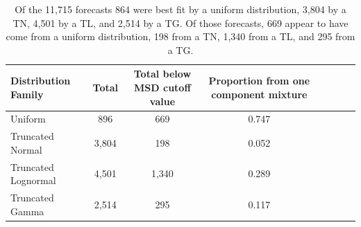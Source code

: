 \documentclass[11pt,notitlepage]{isuthesis}
\begin{document}
\begin{table}[h!]
  \centering
  \begin{tabular}{l*{6}{c}r}
  Distribution Family   & Total    & Total below MSD cutoff value 
  & Proportion from one component mixture\\
  \hline
  Uniform               & 896      & 669  & 0.747  \\
  Truncated Normal      & 3,804    & 198  & 0.052  \\
  Truncated Lognormal   & 4,501    & 1,340 & 0.289 \\
  Truncated Gamma       & 2,514    & 295   & 0.117 \\
  \end{tabular}
  \begin{center}
\begin{minipage}{10cm}
\captionsetup{font=scriptsize}
  \caption[CDC flu retro analysis results]{Of the 11,715
forecasts 864 were best fit by a uniform distribution, 3,804 by a TN, 
4,501 by a TL, and 2,514 by a TG. Of those forecasts, 669 appear to have
come from a uniform distribution, 198 from a TN, 1,340 from a TL, and 295 from
a TG.
}
  \label{table:cdcresults}
  \end{minipage}
  \end{center}
\end{table}
\end{document}
